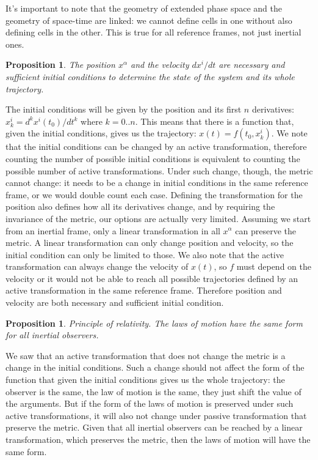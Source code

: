 \documentclass[aps,pra,10pt,twocolumn,floatfix,nofootinbib]{revtex4-1}
\newtheorem{prop}[thm]{Proposition}
\theoremstyle{definition}
\begin{document}
It's important to note that the geometry of extended phase space and the geometry of space-time are linked: we cannot define cells in one without also defining cells in the other. This is true for all reference frames, not just inertial ones.

\begin{prop}\label{continuousLabels}
The position $x^\alpha$ and the velocity $dx^i/dt$ are necessary and sufficient initial conditions to determine the state of the system and its whole trajectory.
\end{prop}

The initial conditions will be given by the position and its first $n$ derivatives: $x^i_k=d^kx^i(t_0)/dt^k$ where $k=0..n$. This means that there is a function that, given the initial conditions, gives us the trajectory: $x(t)=f(t_0, x^i_k)$. We note that the initial conditions can be changed by an active transformation, therefore counting the number of possible initial conditions is equivalent to counting the possible number of active transformations. Under such change, though, the metric cannot change: it needs to be a change in initial conditions in the same reference frame, or we would double count each case. Defining the transformation for the position also defines how all its derivatives change, and by requiring the invariance of the metric, our options are actually very limited. Assuming we start from an inertial frame, only a linear transformation in all $x^\alpha$ can preserve the metric. A linear transformation can only change position and velocity, so the initial condition can only be limited to those. We also note that the active transformation can always change the velocity of $x(t)$, so $f$ must depend on the velocity or it would not be able to reach all possible trajectories defined by an active transformation in the same reference frame. Therefore position and velocity are both necessary and sufficient initial condition.

\begin{prop}
Principle of relativity. The laws of motion have the same form for all inertial observers.
\end{prop}

We saw that an active transformation that does not change the metric is a change in the initial conditions. Such a change should not affect the form of the function that given the initial conditions gives us the whole trajectory: the observer is the same, the law of motion is the same, they just shift the value of the arguments. But if the form of the laws of motion is preserved under such active transformations, it will also not change under passive transformation that preserve the metric. Given that all inertial observers can be reached by a linear transformation, which preserves the metric, then the laws of motion will have the same form.
\end{document}
